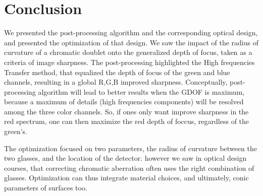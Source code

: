 \documentclass[10pt,letterpaper]{article}
\begin{document}
\section{Conclusion}
We presented the post-processing algorithm and the corresponding optical design, and presented the optimization of that design. We saw the impact of the radius of curvature of a chromatic doublet onto the generalized depth of focus, taken as a criteria of image sharpness. The post-processing highlighted the High frequencies Transfer method, that equalized the depth of focus of the green and blue channels, resulting in a global R,G,B improved sharpness. Conceptually, post-processing algorithm will lead to better results when the GDOF is maximum, because a maximum of details (high frequencies components) will be resolved among the three color channels. So, if ones only want improve sharpness in the red spectrum, one can then maximize the red depth of foccus, regardless of the green's.

The optimization focused on two parameters, the radius of curvature between the two glasses, and the location of the detector. however we saw in optical design courses, that correcting chromatic aberration often uses the right combination of glasses. Optimization can thus integrate material choices, and ultimately, conic parameters of surfaces too.


\listoffigures
\end{document}
